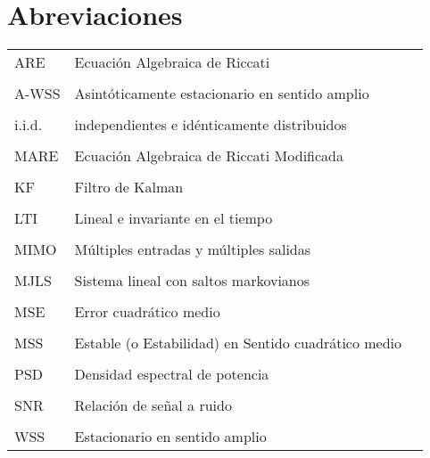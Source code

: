 \section{Abreviaciones}

\vspace{0.5cm}
\begin{tabular}{l p{10cm} l}
ARE & Ecuaci\'on Algebraica de Riccati\\ \\
A-WSS & Asint\'oticamente estacionario en sentido amplio\\ \\
i.i.d. & independientes e id\'enticamente distribuidos\\ \\
MARE & Ecuaci\'on Algebraica de Riccati Modificada\\ \\
KF & Filtro de Kalman \\ \\
LTI & Lineal e invariante en el tiempo\\ \\
MIMO & M\'ultiples entradas y m\'ultiples salidas\\ \\
MJLS & Sistema lineal con saltos markovianos\\ \\
MSE & Error cuadr\'atico medio\\ \\
MSS & Estable (o Estabilidad) en Sentido cuadr\'atico medio\\ \\
PSD & Densidad espectral de potencia\\ \\
SNR & Relaci\'on de se\~nal a ruido\\ \\
WSS & Estacionario en sentido amplio
\end{tabular}
